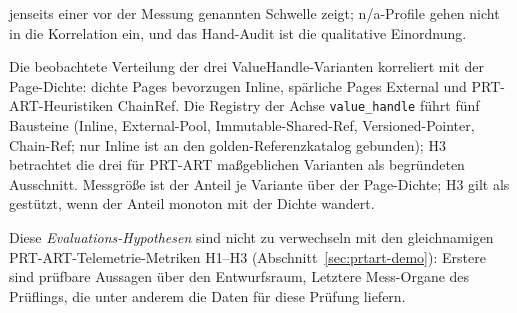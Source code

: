 \begin{description}
  jenseits einer vor der Messung genannten Schwelle zeigt; n/a-Profile gehen nicht in die Korrelation
  ein, und das Hand-Audit ist die qualitative Einordnung.
  \item[H3 (Inline- vs.\ External- vs.\ Chain-Verteilung)] Die beobachtete Verteilung der drei
  ValueHandle-Varianten korreliert mit der Page-Dichte: dichte Pages bevorzugen Inline, spärliche Pages
  External und PRT-ART-Heuristiken ChainRef. Die Registry der Achse \texttt{value\_handle} führt fünf
  Bausteine (Inline, External-Pool, Immutable-Shared-Ref, Versioned-Pointer, Chain-Ref; nur Inline ist
  an den golden-Referenzkatalog gebunden); H3 betrachtet die drei für PRT-ART maßgeblichen Varianten als begründeten
  Ausschnitt. Messgröße ist der Anteil je Variante über der Page-Dichte; H3 gilt als gestützt, wenn
  der Anteil monoton mit der Dichte wandert.
\end{description}
Diese \emph{Evaluations-Hypothesen} sind nicht zu verwechseln mit den gleichnamigen
PRT-ART-Telemetrie-Metriken H1--H3 (Abschnitt~\ref{sec:prtart-demo}): Erstere sind prüfbare Aussagen über
den Entwurfsraum, Letztere Mess-Organe des Prüflings, die unter anderem die Daten für diese Prüfung
liefern.


